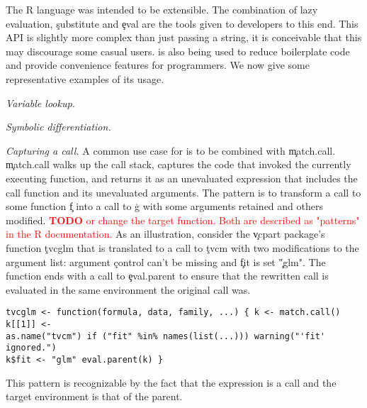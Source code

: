 \documentclass[screen,acmsmall]{acmart}
\newcommand{\mypara}[1]{\medskip\noindent\emph{#1}\xspace}
\newcommand{\authorcomment}[3]{\xspace\textcolor{#1}{{\bf #2} #3}\xspace}
\newcommand{\todo}[1]{\authorcomment{red}{TODO}{#1}}
\begin{document}




The R language was intended to be extensible. The combination of lazy
evaluation, \c{substitute} and \c{eval} are the tools given to
developers to this end. This API is slightly more complex than just
passing a string, it is conceivable that this may discourage some
casual users. \Eval is also being used to reduce boilerplate code and
provide convenience features for programmers. We now give some
representative examples of its usage.

\mypara{Variable lookup.} %

\mypara{Symbolic differentiation.} %

\mypara{Capturing a call.}  A common use case for \eval is to be combined with \c{match.call}.
\c{match.call} walks up the call stack, captures the code that invoked the
currently executing function, and returns it as an unevaluated expression that includes the call function and its unevaluated arguments. The
pattern is to transform a call to some function \c{f} into a call to \c{g} with
some arguments retained and others modified.  \todo{or change the target
function. Both are described as "patterns" in the R documentation.} As an
illustration, consider the \c{vcpart} package's function \c{tvcglm} that is
translated to a call to \c{tvcm} with two modifications to the argument list:
argument \c{control} can't be missing and \c{fit} is set \c{"glm"}. The
function ends with a call to \c{eval.parent} to ensure that the rewritten call
is evaluated in the same environment the original call was.  \begin{lstlisting}
tvcglm <- function(formula, data, family, ...) { k <- match.call() k[[1]] <-
as.name("tvcm") if ("fit" %in% names(list(...))) warning("'fit' ignored.")
k$fit <- "glm" eval.parent(k) } \end{lstlisting} This pattern is recognizable
by the fact that the expression is a call and the target environment is that of
the parent.
\end{document}
